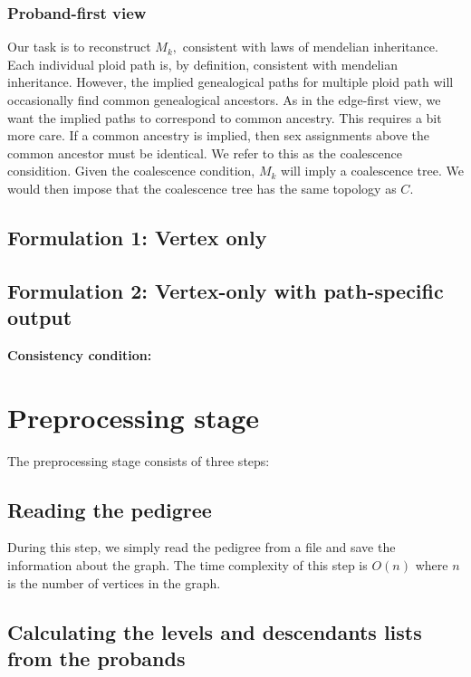 \documentclass[14pt]{extarticle}
\begin{document}
\subsubsection{Proband-first view}
Our task is to reconstruct $M_k,$ consistent with laws of mendelian inheritance. Each individual ploid path is, by definition, consistent with mendelian inheritance. 
However, the implied genealogical paths for multiple ploid path will occasionally find common genealogical ancestors. As in the edge-first view, we want the 
implied paths to correspond to common ancestry. This requires a bit more care. If a common ancestry is implied, then sex assignments above the common ancestor must be identical. 
We refer to this as the coalescence considition. Given the coalescence condition, $M_k$ will imply a coalescence tree. 
We would then impose that the coalescence tree has the same topology as $C.$  







 

\subsection{Formulation 1: Vertex only} 

\subsection{Formulation 2: Vertex-only with path-specific output}

\textbf{Consistency condition:} 

\section{Preprocessing stage}

The preprocessing stage consists of three steps:

\subsection{Reading the pedigree}

During this step, we simply read the pedigree from a file and save the information about the graph. The time complexity of this step is $O(n)$ where $n$ is the number of vertices in the graph.

\subsection{Calculating the levels and descendants lists from the probands}
\end{document}
